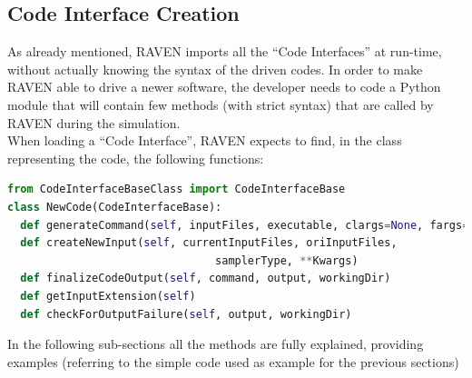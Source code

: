 \subsection{Code Interface Creation} 
\label{subsec:codeinterfacecreation}
As already mentioned, RAVEN imports all the ``Code Interfaces'' at run-time, 
without actually knowing the syntax of the driven codes. In order to make RAVEN
able to drive a newer software, the developer needs to code a Python module 
that will contain few methods (with strict syntax) that are called by RAVEN during the simulation.
\\ When loading a ``Code Interface'', RAVEN expects to find, in the class representing the code,
 the following functions:
\begin{lstlisting}[language=python]
from CodeInterfaceBaseClass import CodeInterfaceBase
class NewCode(CodeInterfaceBase):
  def generateCommand(self, inputFiles, executable, clargs=None, fargs=None)
  def createNewInput(self, currentInputFiles, oriInputFiles,
                                samplerType, **Kwargs)                           
  def finalizeCodeOutput(self, command, output, workingDir)
  def getInputExtension(self)
  def checkForOutputFailure(self, output, workingDir)
\end{lstlisting} 
In the following sub-sections all the methods are fully explained, providing examples
 (referring to the simple code used as example for the previous sections)


